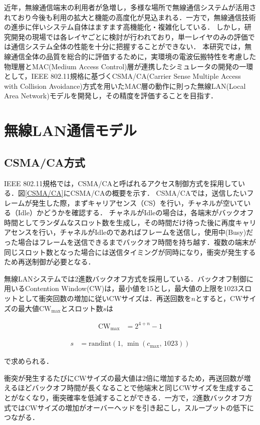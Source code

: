 \documentclass[a4paper, 10pt]{ltjsarticle}
\begin{document}
近年，無線通信端末の利用者が急増し，多様な場所で無線通信システムが活用されており今後も利用の拡大と機能の高度化が見込まれる．一方で，無線通信技術の進歩に伴いシステム自体はますます高機能化・複雑化している．
しかし，研究開発の現場では各レイヤごとに検討が行われており，単一レイヤのみの評価では通信システム全体の性能を十分に把握することができない．
本研究では，無線通信全体の品質を総合的に評価するために，実環境の電波伝搬特性を考慮した物理層とMAC(Medium Access Control)層が連携したシミュレータの開発の一環として，IEEE 802.11規格に基づくCSMA/CA(Carrier Sense Multiple Access with Collision Avoidance)方式を用いたMAC層の動作に則った無線LAN(Local Area Network)モデルを開発し，その精度を評価することを目指す．


\section{無線LAN通信モデル}


\subsection{CSMA/CA方式}

IEEE 802.11規格では，CSMA/CAと呼ばれるアクセス制御方式を採用している．図\ref{CSMA/CA}にCSMA/CAの概要を示す．
CSMA/CAでは，送信したいフレームが発生した際，まずキャリアセンス（CS）を行い，チャネルが空いている（Idle）かどうかを確認する．
チャネルがIdleの場合は，各端末がバックオフ時間としてランダムなスロット数を生成し，その時間だけ待った後に再度キャリアセンスを行い，チャネルがIdleのであればフレームを送信し，使用中(Busy)だった場合はフレームを送信できるまでバックオフ時間を持ち越す．複数の端末が同じスロット数となった場合には送信タイミングが同時になり，衝突が発生するため再送制御が必要となる．

無線LANシステムでは2進数バックオフ方式を採用している．バックオフ制御に用いるContention Window(CW)は，最小値を15とし，最大値の上限を1023スロットとして衝突回数の増加に従いCWサイズは．再送回数を$n$とすると，CWサイズの最大値$\mathrm{CW}_{\max}$とスロット数$s$は


\begin{align}
  \mathrm{CW}_{\max} &= 2^{4 + n} - 1
\end{align}

\begin{align}
  s &= \mathrm{randint}(1, \, \min(c_{\max}, \, 1023))
  \label{slot}
\end{align}

で求められる．

衝突が発生するたびにCWサイズの最大値は2倍に増加するため，再送回数が増えるほどバックオフ時間が長くなることで他端末と同じCWサイズを生成することがなくなり，衝突確率を低減することができる．一方で，2進数バックオフ方式ではCWサイズの増加がオーバーヘッドを引き起こし，スループットの低下につながる．
\end{document}
